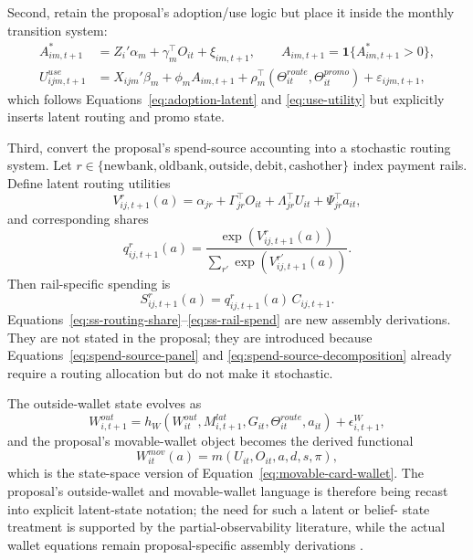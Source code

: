 \documentclass[11pt]{article}
\newcommand{\1}{\mathbf{1}}
\begin{document}
Second, retain the proposal's adoption/use logic but place it inside the
monthly transition system:
\begin{align}
  A^*_{im,t+1}
    &= Z_i'\alpha_m + \gamma_m^{\top}O_{it} + \xi_{im,t+1},
       \qquad A_{im,t+1}=\1\{A^*_{im,t+1}>0\},
       \label{eq:ss-adoption-transition}\\
  U^{use}_{ijm,t+1}
    &= X_{ijm}'\beta_m + \phi_m A_{im,t+1}
       + \rho_m^{\top}(\Theta^{route}_{it},\Theta^{promo}_{it})
       + \varepsilon_{ijm,t+1},
       \label{eq:ss-use-utility}
\end{align}
which follows Equations~\eqref{eq:adoption-latent} and
\eqref{eq:use-utility} but explicitly inserts latent routing and promo state.

Third, convert the proposal's spend-source accounting into a stochastic routing
system. Let $r\in\{\mathrm{newbank},\mathrm{oldbank},\mathrm{outside},\mathrm{debit},\mathrm{cashother}\}$
index payment rails. Define latent routing utilities
\begin{equation}
  V^{r}_{ij,t+1}(a)
  =
  \alpha_{jr} + \Gamma_{jr}^{\top}O_{it} + \Lambda_{jr}^{\top}U_{it}
  + \Psi_{jr}^{\top}a_{it},
  \label{eq:ss-routing-utility}
\end{equation}
and corresponding shares
\begin{equation}
  q^r_{ij,t+1}(a)
  =
  \frac{\exp(V^r_{ij,t+1}(a))}{\sum_{r'}\exp(V^{r'}_{ij,t+1}(a))}.
  \label{eq:ss-routing-share}
\end{equation}
Then rail-specific spending is
\begin{equation}
  S^r_{ij,t+1}(a) = q^r_{ij,t+1}(a)\,C_{ij,t+1}.
  \label{eq:ss-rail-spend}
\end{equation}
Equations~\eqref{eq:ss-routing-share}--\eqref{eq:ss-rail-spend} are new
assembly derivations. They are not stated in the proposal; they are introduced
because Equations~\eqref{eq:spend-source-panel} and
\eqref{eq:spend-source-decomposition} already require a routing allocation but
do not make it stochastic.

The outside-wallet state evolves as
\begin{equation}
  W^{out}_{i,t+1}
  =
  h_W(W^{out}_{it},M^{lat}_{i,t+1},G_{it},\Theta^{route}_{it},a_{it})
  + \epsilon^W_{i,t+1},
  \label{eq:ss-outside-wallet-transition}
\end{equation}
and the proposal's movable-wallet object becomes the derived functional
\begin{equation}
  W^{mov}_{it}(a)
  =
  m(U_{it},O_{it},a,d,s,\pi),
  \label{eq:ss-movable-wallet}
\end{equation}
which is the state-space version of Equation~\eqref{eq:movable-card-wallet}.
The proposal's outside-wallet and movable-wallet language is therefore being
recast into explicit latent-state notation; the need for such a latent or belief-
state treatment is supported by the partial-observability literature, while the
actual wallet equations remain proposal-specific assembly derivations
\citep{smallwood1973pomdp,kaelbling1998pomdp}.
\end{document}
